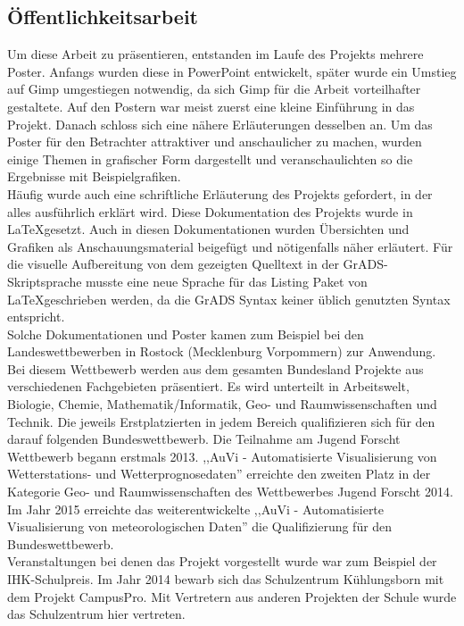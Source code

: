 \subsection{Öffentlichkeitsarbeit} %
Um diese Arbeit zu präsentieren, entstanden im Laufe des Projekts mehrere Poster.
Anfangs wurden diese in PowerPoint entwickelt, später wurde ein Umstieg
auf Gimp umgestiegen notwendig,
da sich Gimp für die Arbeit vorteilhafter gestaltete.
Auf den Postern war meist zuerst eine kleine Einführung in das Projekt.
Danach schloss sich eine nähere Erläuterungen desselben an.
Um das Poster für den Betrachter attraktiver und anschaulicher zu machen,
wurden einige Themen in grafischer Form dargestellt und
veranschaulichten so die Ergebnisse mit Beispielgrafiken. \\
Häufig wurde auch eine schriftliche Erläuterung des Projekts gefordert,
in der alles ausführlich erklärt wird.
Diese Dokumentation des Projekts wurde in \LaTeX gesetzt.
Auch in diesen Dokumentationen wurden Übersichten und Grafiken als Anschauungsmaterial
beigefügt und nötigenfalls näher erläutert. Für die visuelle Aufbereitung von
dem gezeigten Quelltext in der GrADS-Skriptsprache musste eine neue Sprache für das
Listing Paket von \LaTeX geschrieben werden, da die GrADS Syntax keiner üblich genutzten
Syntax entspricht.\\
Solche Dokumentationen und Poster kamen zum Beispiel bei
den Landeswettbewerben \jf in Rostock (Mecklenburg Vorpommern) zur Anwendung.
Bei diesem Wettbewerb werden aus dem gesamten
Bundesland Projekte aus verschiedenen Fachgebieten präsentiert.
Es wird unterteilt in Arbeitswelt, Biologie, Chemie,
Mathematik/Informatik, Geo- und Raumwissenschaften und Technik.
Die jeweils Erstplatzierten in jedem Bereich
qualifizieren sich für den darauf folgenden Bundeswettbewerb.
Die Teilnahme am Jugend Forscht Wettbewerb begann erstmals 2013.
,,AuVi - Automatisierte Visualisierung von Wetterstations- und Wetterprognosedaten''
erreichte den zweiten Platz in der Kategorie Geo- und Raumwissenschaften des Wettbewerbes
Jugend Forscht 2014.
Im Jahr 2015 erreichte das weiterentwickelte
,,AuVi - Automatisierte Visualisierung von meteorologischen Daten''
die Qualifizierung für den Bundeswettbewerb.\\
Veranstaltungen bei denen das Projekt vorgestellt wurde war zum Beispiel der IHK-Schulpreis.
Im Jahr 2014 bewarb sich das Schulzentrum Kühlungsborn mit dem Projekt CampusPro.
Mit Vertretern aus anderen Projekten der Schule wurde das Schulzentrum hier vertreten.
